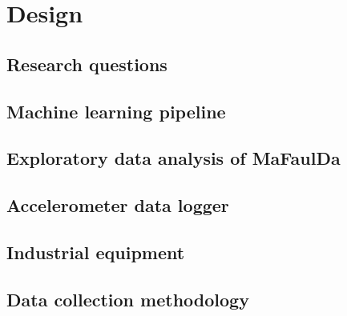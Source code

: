 \chapter{Design} \label{chapter:design}


\section{Research questions}




\section{Machine learning pipeline}





\section{Exploratory data analysis of MaFaulDa}


\section{Accelerometer data logger}





\section{Industrial equipment}


\section{Data collection methodology}





